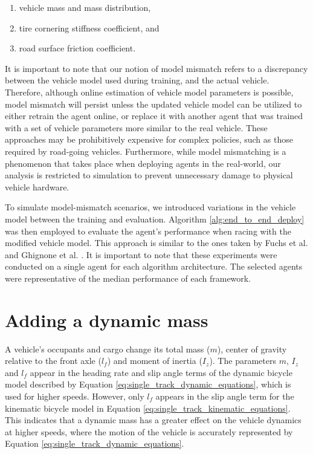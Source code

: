 \begin{enumerate}
\item vehicle mass and mass distribution,
\item tire cornering stiffness coefficient, and
\item road surface friction coefficient.
\end{enumerate}


It is important to note that our notion of model mismatch refers to a discrepancy between the vehicle model used during training, and the actual vehicle.
Therefore, although online estimation of vehicle model parameters is possible, model mismatch will persist unless the updated vehicle model can be utilized to either retrain the agent online, or replace it with another agent that was trained with a set of vehicle parameters more similar to the real vehicle.
These approaches may be prohibitively expensive for complex policies, such as those required by road-going vehicles.
Furthermore, while model mismatching is a phenomenon that takes place when deploying agents in the real-world, our analysis is restricted to simulation to prevent unnecessary damage to physical vehicle hardware.

To simulate model-mismatch scenarios, we introduced variations in the vehicle model between the training and evaluation.
Algorithm \ref{alg:end_to_end_deploy} was then employed to evaluate the agent's performance when racing with the modified vehicle model.
This approach is similar to the ones taken by Fuchs et al. \cite{Fuchs2021} and Ghignone et al. \cite{Ghignone2022}.
It is important to note that these experiments were conducted on a single agent for each algorithm architecture.
The selected agents were representative of the median performance of each framework.





\section{Adding a dynamic mass}

A vehicle's occupants and cargo change its total mass ($m$), center of gravity relative to the front axle ($l_f$) and moment of inertia ($I_z$).
The parameters $m$, $I_z$ and $l_f$ appear in the heading rate and slip angle terms of the dynamic bicycle model described by Equation \ref{eq:single_track_dynamic_equations}, which is used for higher speeds.
However, only $l_f$ appears in the slip angle term for the kinematic bicycle model in Equation \ref{eq:single_track_kinematic_equations}.
This indicates that a dynamic mass has a greater effect on the vehicle dynamics at higher speeds, where the motion of the vehicle is accurately represented by Equation \ref{eq:single_track_dynamic_equations}.


